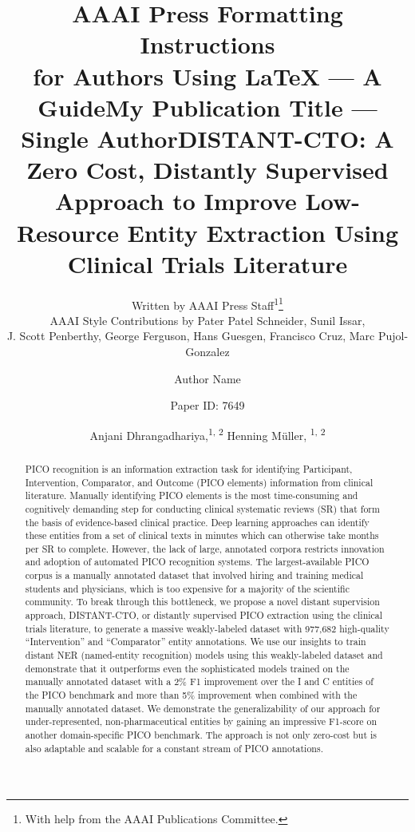 \documentclass[letterpaper]{article} %
\title{AAAI Press Formatting Instructions \\for Authors Using \LaTeX{} --- A Guide}
\author{
    Written by AAAI Press Staff\textsuperscript{\rm 1}\thanks{With help from the AAAI Publications Committee.}\\
    AAAI Style Contributions by Pater Patel Schneider,
    Sunil Issar,\\
    J. Scott Penberthy,
    George Ferguson,
    Hans Guesgen,
    Francisco Cruz\equalcontrib,
    Marc Pujol-Gonzalez\equalcontrib
}
\title{My Publication Title --- Single Author}
\author {
    Author Name
}
\title{DISTANT-CTO: A Zero Cost, Distantly Supervised Approach to Improve Low-Resource Entity Extraction Using Clinical Trials Literature}
\author {
    Paper ID: 7649
}
\author {
    Anjani Dhrangadhariya,\textsuperscript{\rm 1, 2}
    Henning M\"uller, \textsuperscript{\rm 1, 2}
}
\begin{document}
\maketitle

\begin{abstract}
PICO recognition is an information extraction task for identifying Participant, Intervention, Comparator, and Outcome (PICO elements) information from clinical literature.
Manually identifying PICO elements is the most time-consuming and cognitively demanding step for conducting clinical systematic reviews (SR) that form the basis of evidence-based clinical practice. Deep learning approaches can identify these entities from a set of clinical texts in minutes which can otherwise take months per SR to complete.
However, the lack of large, annotated corpora restricts innovation and adoption of automated PICO recognition systems.
The largest-available PICO corpus is a manually annotated dataset that involved hiring and training medical students and physicians, which is too expensive for a majority of the scientific community.
To break through this bottleneck, we propose a novel distant supervision approach, DISTANT-CTO, or distantly supervised PICO extraction using the clinical trials literature, to generate a massive weakly-labeled dataset with 977,682 high-quality ``Intervention'' and ``Comparator'' entity annotations.
We use our insights to train distant NER (named-entity recognition) models using this weakly-labeled dataset and demonstrate that it outperforms even the sophisticated models trained on the manually annotated dataset with a 2\% F1 improvement over the I and C entities of the PICO benchmark and more than 5\% improvement when combined with the manually annotated dataset.
We demonstrate the generalizability of our approach for under-represented, non-pharmaceutical entities by gaining an impressive F1-score on another domain-specific PICO benchmark.
The approach is not only zero-cost but is also adaptable and scalable for a constant stream of PICO annotations.
\end{abstract}
%
\end{document}
